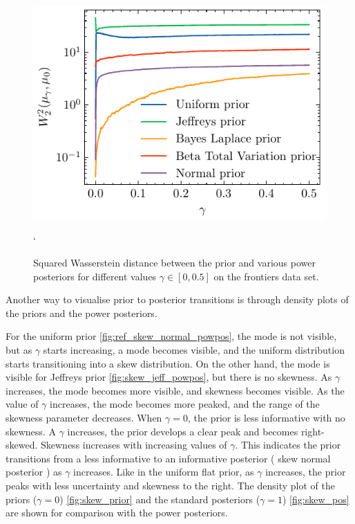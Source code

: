 \documentclass[12pt]{article}
\begin{document}
\begin{figure}
\begin{center}
\includegraphics{imgs/wasser_distskew.pdf}
\end{center}`
\caption{Squared Wasserstein distance between the prior and various power
posteriors for different values $\gamma \in [0, 0.5]$ on the frontiers
data set.}\label{fig:skew_diff_priors}
\end{figure}

Another way to visualise prior to posterior transitions  is through density plots  of the priors and the power posteriors. 

For the uniform prior \cref{fig:ref_skew_normal_powpos}, the mode is not visible, but as $\gamma$
starts increasing, a mode becomes visible, and the uniform distribution starts
transitioning into a skew distribution. On the other hand, the mode is visible
for Jeffreys prior \cref{fig:skew_jeff_powpos}, but there is no skewness. As $\gamma$ increases, the mode
becomes more visible, and skewness becomes visible. As the value of $\gamma$
increases, the mode becomes more peaked, and the range of the skewness
parameter decreases. When $\gamma=0$, the prior is less informative with no skewness. A $\gamma$ increases, the prior develops a clear peak and becomes right-skewed. Skewness increases with increasing values of $\gamma$. This indicates the prior transitions from a less informative to an informative posterior ( skew normal posterior ) as $\gamma$ increases. Like in the uniform flat prior, as $\gamma$ increases, the prior peaks with less uncertainty and skewness to the right. The density plot of the priors ($\gamma=0$)  \cref{fig:skew_prior} and the standard posteriors ($\gamma=1$) \cref{fig:skew_pos} are shown for comparison with the power posteriors.
\end{document}
